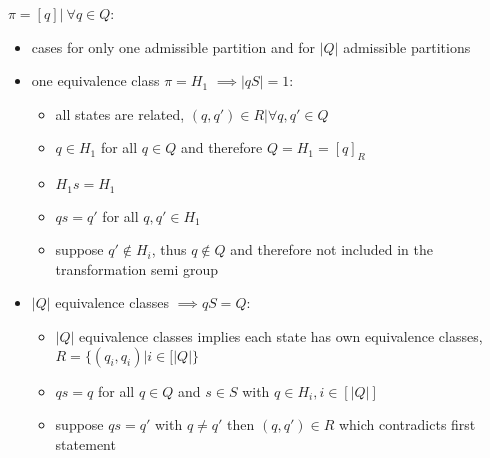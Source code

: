 \documentclass[a4paper,12pt,numbers=noenddot]{scrreport}
\begin{document}
$\pi = {[q] |\ \forall q \in Q}$:
\begin{itemize}
    \item cases for only one admissible partition and for $|Q|$ admissible partitions
    \item one equivalence class $\pi = H_1$ $\implies |qS| = 1$: 
        \begin{itemize}
            \item all states are related, $(q,q') \in R | \forall q,q' \in Q$
            \item $q \in H_1$ for all $q \in Q$  and therefore $Q = H_1 = [q]_R$
            \item $H_1s = H_1$
            \item $qs = q'$ for all $q,q' \in H_1$
            \item suppose $q' \notin H_i$, thus $q \notin Q$ and therefore not included in the transformation semi group
        \end{itemize}
    \item $|Q|$ equivalence classes $\implies qS = Q$:
        \begin{itemize}
            \item $|Q|$ equivalence classes implies each state has own equivalence classes, $R = \{(q_i, q_i) | i \in [|Q|\}$
            \item $qs = q$ for all $q \in Q$ and $s \in S$ with $q \in H_i, i \in [|Q|]$
            \item suppose $qs = q'$ with $q \neq q'$ then $(q, q') \in R$ which contradicts first statement
        \end{itemize}
\end{itemize}
\end{document}
